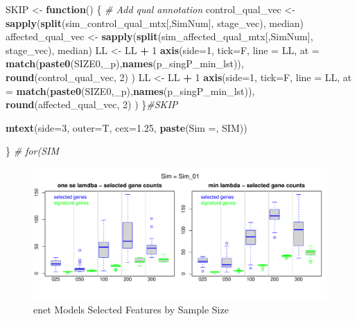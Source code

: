 \documentclass[
]{book}
\newenvironment{Shaded}{\begin{snugshade}}{\end{snugshade}}
\newcommand{\CommentTok}[1]{\textcolor[rgb]{0.56,0.35,0.01}{\textit{#1}}}
\newcommand{\ControlFlowTok}[1]{\textcolor[rgb]{0.13,0.29,0.53}{\textbf{#1}}}
\newcommand{\DataTypeTok}[1]{\textcolor[rgb]{0.13,0.29,0.53}{#1}}
\newcommand{\DecValTok}[1]{\textcolor[rgb]{0.00,0.00,0.81}{#1}}
\newcommand{\FloatTok}[1]{\textcolor[rgb]{0.00,0.00,0.81}{#1}}
\newcommand{\KeywordTok}[1]{\textcolor[rgb]{0.13,0.29,0.53}{\textbf{#1}}}
\newcommand{\NormalTok}[1]{#1}
\newcommand{\OperatorTok}[1]{\textcolor[rgb]{0.81,0.36,0.00}{\textbf{#1}}}
\newcommand{\StringTok}[1]{\textcolor[rgb]{0.31,0.60,0.02}{#1}}
\begin{document}
\begin{Shaded}
\begin{Highlighting}[]
\NormalTok{SKIP  <{-}}\StringTok{ }\ControlFlowTok{function}\NormalTok{() \{}
\CommentTok{\# Add qual annotation}
\NormalTok{control\_qual\_vec <{-}}\StringTok{ }\KeywordTok{sapply}\NormalTok{(}\KeywordTok{split}\NormalTok{(sim\_control\_qual\_mtx[,SimNum], stage\_vec), median)}
\NormalTok{affected\_qual\_vec <{-}}\StringTok{ }\KeywordTok{sapply}\NormalTok{(}\KeywordTok{split}\NormalTok{(sim\_affected\_qual\_mtx[,SimNum], stage\_vec), median)}
\NormalTok{LL <{-}}\StringTok{ }\NormalTok{LL }\OperatorTok{+}\StringTok{ }\DecValTok{1}
\KeywordTok{axis}\NormalTok{(}\DataTypeTok{side=}\DecValTok{1}\NormalTok{, }\DataTypeTok{tick=}\NormalTok{F, }\DataTypeTok{line =}\NormalTok{ LL,}
  \DataTypeTok{at =}  \KeywordTok{match}\NormalTok{(}\KeywordTok{paste0}\NormalTok{(SIZE0,}\StringTok{\textquotesingle{}\_p\textquotesingle{}}\NormalTok{),}\KeywordTok{names}\NormalTok{(p\_singP\_min\_lst)),}
  \KeywordTok{round}\NormalTok{(control\_qual\_vec, }\DecValTok{2}\NormalTok{)}
\NormalTok{ )}
\NormalTok{LL <{-}}\StringTok{ }\NormalTok{LL }\OperatorTok{+}\StringTok{ }\DecValTok{1}
\KeywordTok{axis}\NormalTok{(}\DataTypeTok{side=}\DecValTok{1}\NormalTok{, }\DataTypeTok{tick=}\NormalTok{F, }\DataTypeTok{line =}\NormalTok{ LL,}
  \DataTypeTok{at =}  \KeywordTok{match}\NormalTok{(}\KeywordTok{paste0}\NormalTok{(SIZE0,}\StringTok{\textquotesingle{}\_p\textquotesingle{}}\NormalTok{),}\KeywordTok{names}\NormalTok{(p\_singP\_min\_lst)),}
  \KeywordTok{round}\NormalTok{(affected\_qual\_vec, }\DecValTok{2}\NormalTok{)}
\NormalTok{ )}
\NormalTok{\}}\CommentTok{\#SKIP}

\KeywordTok{mtext}\NormalTok{(}\DataTypeTok{side=}\DecValTok{3}\NormalTok{, }\DataTypeTok{outer=}\NormalTok{T, }\DataTypeTok{cex=}\FloatTok{1.25}\NormalTok{, }\KeywordTok{paste}\NormalTok{(}\StringTok{\textquotesingle{}Sim =\textquotesingle{}}\NormalTok{,  SIM))}

\NormalTok{\} }\CommentTok{\# for(SIM}
\end{Highlighting}
\end{Shaded}

\begin{figure}
\centering
\includegraphics{Static/figures/hcc5hmC-glmnetSuiteB-enet-simRes-features-bySim-1.pdf}
\caption{\label{fig:hcc5hmC-glmnetSuiteB-enet-simRes-features-bySim}enet Models Selected Features by Sample Size}
\end{figure}
\end{document}
